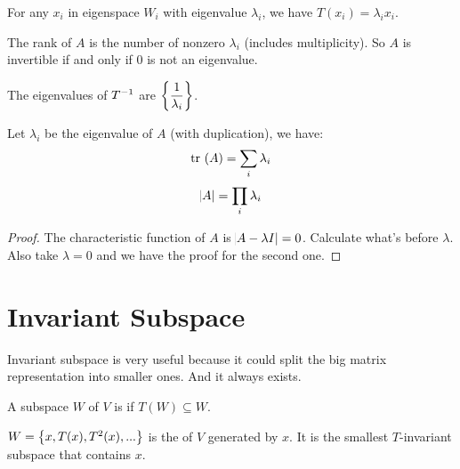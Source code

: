 \begin{theorem}
    For any $x_i$ in eigenspace $W_i$ with eigenvalue $\lambda_i$, we have $T(x_i) = \lambda_i x_i$.
\end{theorem}

\begin{theorem}
    The rank of $A$ is the number of nonzero $\lambda_i$ (includes multiplicity). So $A$ is invertible if and only if $0$ is not an eigenvalue.    
\end{theorem}

\begin{theorem}
    The eigenvalues of ${T}^{-1}$ are $\displaystyle \set{\frac{1}{\lambda_i}}$.
\end{theorem}


\begin{theorem}
    Let $\lambda_i$ be the eigenvalue of $A$ (with duplication), we have:
    \begin{equation}
        \displaystyle \mathrm{tr}~( A ) = \sum_i \lambda_i
    \end{equation}
    \begin{equation}
        \abs{A} = \prod_i \lambda_i
    \end{equation}
\end{theorem}
\begin{proof}
    The characteristic function of $A$ is $\abs{A - \lambda I} = 0$. Calculate what's before $\lambda$. Also take $\lambda=0$ and we have the proof for the second one.
\end{proof}



\section{Invariant Subspace}

Invariant subspace is very useful because it could split the big matrix representation into smaller ones. And it always exists.

\begin{definition}[$T$-invariant]
    A subspace $W$ of $V$ is  if $T(W) \subseteq W$.
\end{definition}

\begin{definition}[$T$-cyclic]
    $W = \set{x, T(x), T^2(x), ...}$ is the  of $V$ generated by $x$. It is the smallest $T$-invariant subspace that contains $x$.
\end{definition}

